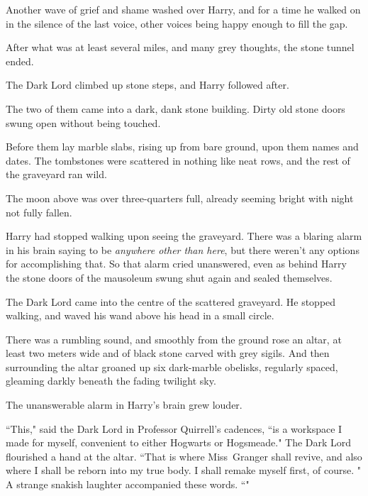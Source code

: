 Another wave of grief and shame washed over Harry, and for a time he walked on in the silence of the last voice, other voices being happy enough to fill the gap.

After what was at least several miles, and many grey thoughts, the stone tunnel ended.

The Dark Lord climbed up stone steps, and Harry followed after.

The two of them came into a dark, dank stone building. Dirty old stone doors swung open without being touched.

Before them lay marble slabs, rising up from bare ground, upon them names and dates. The tombstones were scattered in nothing like neat rows, and the rest of the graveyard ran wild.

The moon above was over three-quarters full, already seeming bright with night not fully fallen.

Harry had stopped walking upon seeing the graveyard. There was a blaring alarm in his brain saying to be \emph{anywhere other than here}, but there weren't any options for accomplishing that. So that alarm cried unanswered, even as behind Harry the stone doors of the mausoleum swung shut again and sealed themselves.

The Dark Lord came into the centre of the scattered graveyard. He stopped walking, and waved his wand above his head in a small circle.

There was a rumbling sound, and smoothly from the ground rose an altar, at least two meters wide and of black stone carved with grey sigils. And then surrounding the altar groaned up six dark-marble obelisks, regularly spaced, gleaming darkly beneath the fading twilight sky.

The unanswerable alarm in Harry's brain grew louder.

``This," said the Dark Lord in Professor Quirrell's cadences, ``is a workspace I made for myself, convenient to either Hogwarts or Hogsmeade." The Dark Lord flourished a hand at the altar. ``That is where Miss~Granger shall revive, and also where I shall be reborn into my true body. I shall remake myself first, of course. " A strange snakish laughter accompanied these words. ``"

